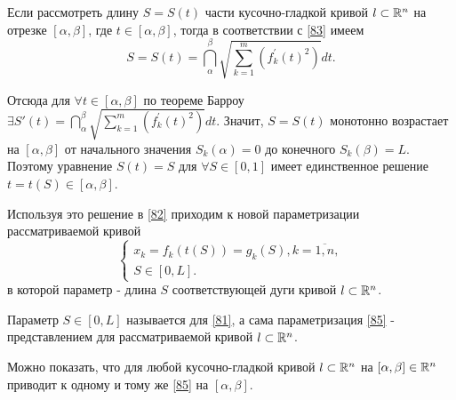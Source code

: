 Если рассмотреть длину $S = S(t)$ части кусочно-гладкой кривой $l \subset \mathbb{R}^n$ на отрезке $[\alpha, \beta]$, где $t \in [\alpha, \beta]$, тогда в соответствии с \eqref{83} имеем
\begin{equation}
\label{84}
S = S(t) = \dint\limits_{\alpha}^{\beta} \sqrt{\sum_{k=1}^{m} \left(f_k^{'} (t)^2\right) } dt.
\end{equation}

Отсюда для $\forall t \in [\alpha, \beta]$ по теореме Барроу $\exists S'(t) = \dint\limits_{\alpha}^{\beta} \sqrt{\sum_{k=1}^{m} \left(f_k^{'} (t)^2\right) } dt$. Значит, $S = S(t)$ монотонно возрастает на $[\alpha, \beta]$ от начального значения $S_k(\alpha) = 0$ до конечного $S_k(\beta) = L$. Поэтому уравнение $S(t) = S$ для $\forall S \in [0, 1]$ имеет единственное решение $t = t(S) \in [\alpha, \beta]$.

Используя это решение в \eqref{82} приходим к новой параметризации рассматриваемой кривой 
\begin{equation}
\label{85}
\begin{cases}
x_k = f_k(t(S)) = g_k(S), k = \overline{1, n}, \\
S \in [0, L].
\end{cases}
\end{equation}
в которой параметр - длина $S$ соответствующей дуги кривой $l \subset \mathbb{R}^n$.

\begin{definition}
	Параметр $S \in [0, L]$ называется  для \eqref{81}, а сама параметризация \eqref{85} -  представлением для рассматриваемой кривой $l \subset \mathbb{R}^n$. 
\end{definition}

Можно показать, что для любой кусочно-гладкой кривой $l \subset \mathbb{R}^n$  на $[\alpha, \beta] \in \mathbb{R}^n$ приводит к одному и тому же  \eqref{85} на $[\alpha, \beta]$.

